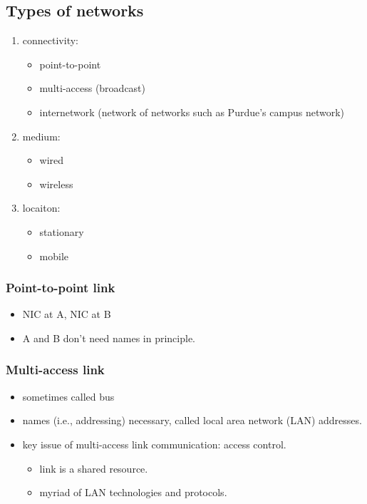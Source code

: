 \documentclass{../../ainote}
\begin{document}
\subsection{Types of networks}
\begin{enumerate}
    \item connectivity:
        \begin{itemize}
            \item point-to-point
            \item multi-access (broadcast)
            \item internetwork (network of networks such as Purdue's campus network)
        \end{itemize}
    \item medium:
        \begin{itemize}
            \item wired
            \item wireless
        \end{itemize}
    \item locaiton:
        \begin{itemize}
            \item stationary
            \item mobile
        \end{itemize}
\end{enumerate}

\subsubsection{Point-to-point link}
\begin{itemize}[leftmargin=*]
    \item NIC at A, NIC at B
    \item A and B don't need names in principle.
\end{itemize}

\subsubsection{Multi-access link}
\begin{itemize}[leftmargin=*]
    \item sometimes called bus
    \item names (i.e., addressing) necessary, called local area network (LAN) addresses.
    \item key issue of multi-access link communication: access
    control.
        \begin{itemize}
            \item link is a shared resource.
            \item myriad of LAN technologies and protocols.
        \end{itemize}
\end{itemize}  
\end{document}
